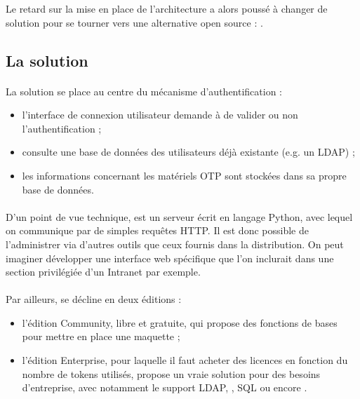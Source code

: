 Le retard sur la mise en place de l'architecture a alors poussé \asmile{} à changer de solution pour se tourner vers une alternative open source : \alinotp{}.


\subsection{La solution \alinotp{}}

\paragraph{}
La solution \alinotp{} se place au centre du mécanisme d'authentification :

\begin{itemize}
	\item l'interface de connexion utilisateur demande à \alinotp{} de valider ou non l'authentification ;
	\item \alinotp{} consulte une base de données des utilisateurs déjà existante (e.g. un LDAP) ;
	\item les informations concernant les matériels OTP sont stockées dans sa propre base de données.
\end{itemize}

\paragraph{}
D'un point de vue technique, \alinotp{} est un serveur écrit en langage Python, avec lequel on communique par de simples requêtes HTTP.
Il est donc possible de l'administrer via d'autres outils que ceux fournis dans la distribution.
On peut imaginer développer une interface web spécifique que l'on inclurait dans une section privilégiée d'un Intranet par exemple.

\paragraph{}
Par ailleurs, \alinotp{} se décline en deux éditions :

\begin{itemize}
	\item l'édition Community, libre et gratuite, qui propose des fonctions de bases pour mettre en place une maquette ;
	\item l'édition Enterprise, pour laquelle il faut acheter des licences en fonction du nombre de tokens utilisés, propose un vraie solution pour des besoins d'entreprise, avec notamment le support LDAP, \aad{}, SQL ou encore \afreerad{}.
\end{itemize}

